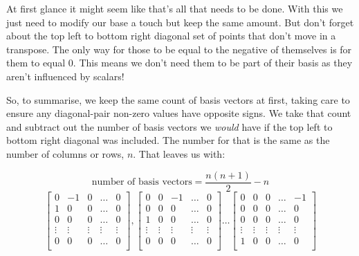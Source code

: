 At first glance it might seem like that's all that needs to be done. With this we just need to modify our base a touch but keep the same amount. But don't forget about the top left to bottom right diagonal set of points that don't move in a transpose. The only way for those to be equal to the negative of themselves is for them to equal 0. This means we don't need them to be part of their basis as they aren't influenced by scalars! 

So, to summarise, we keep the same count of basis vectors at first, taking care to ensure any diagonal-pair non-zero values have opposite signs. We take that count and subtract out the number of basis vectors we \emph{would} have if the top left to bottom right diagonal was included. The number for that is the same as the number of columns or rows, $n$. That leaves us with:

\[\text{number of basis vectors} = \frac{n(n+1)}{2} - n\]
\[
	\begin{bmatrix}
		0&-1&0&\dots&0\\
		1&0&0&\dots&0\\
		0&0&0&\dots&0\\
		\vdots & \vdots &\vdots & \vdots & \vdots \\
		0&0&0&\dots&0\\
	\end{bmatrix},	
	\begin{bmatrix}
		0&0&-1&\dots&0\\
		0&0&0&\dots&0\\
		1&0&0&\dots&0\\
		\vdots & \vdots &\vdots & \vdots & \vdots \\
		0&0&0&\dots&0\\
	\end{bmatrix}
	\dots
	\begin{bmatrix}
		0&0&0&\dots&-1\\
		0&0&0&\dots&0\\
		0&0&0&\dots&0\\
		\vdots & \vdots &\vdots & \vdots & \vdots \\
		1&0&0&\dots&0\\
	\end{bmatrix}
\]
